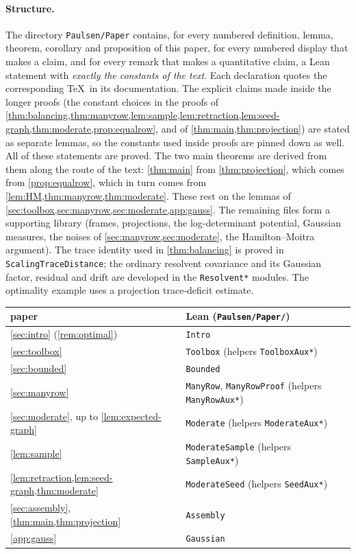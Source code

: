 \paragraph{Structure.} The directory \texttt{Paulsen/Paper} contains, for every numbered definition, lemma, theorem, corollary and
proposition of this paper, for every numbered display that makes a claim, and
for every remark that makes a quantitative claim, a Lean statement with
\emph{exactly the constants of the text}. Each declaration quotes the
corresponding \TeX\ in its documentation. The explicit claims made inside the
longer proofs (the constant choices in the proofs of
\cref{thm:balancing,thm:manyrow,lem:sample,lem:retraction,lem:seed-graph,thm:moderate,prop:equalrow},
and of \cref{thm:main,thm:projection}) are stated as separate lemmas, so the
constants used inside proofs are pinned down as well. All of these statements
are proved. The two main theorems are derived from them along the route of the
text:
\cref{thm:main} from \cref{thm:projection}, which comes from \cref{prop:equalrow}, which in turn comes from
\cref{lem:HM,thm:manyrow,thm:moderate}. These rest on the lemmas of
\cref{sec:toolbox,sec:manyrow,sec:moderate,app:gauss}. The remaining files form a supporting
library (frames, projections, the log-determinant potential, Gaussian measures,
the noises of \cref{sec:manyrow,sec:moderate}, the Hamilton--Moitra argument).
The trace identity used in \cref{thm:balancing} is proved in
\texttt{ScalingTraceDistance}; the ordinary resolvent covariance and its
Gaussian factor, residual and drift are developed in the \texttt{Resolvent*}
modules. The optimality example uses a projection trace-deficit estimate.
\begin{center}
\small
\begin{tabular}{@{}ll@{}}
\toprule
paper & Lean (\texttt{Paulsen/Paper/})\\
\midrule
\cref{sec:intro} (\cref{rem:optimal}) & \texttt{Intro}\\
\cref{sec:toolbox} & \texttt{Toolbox} (helpers \texttt{ToolboxAux*})\\
\cref{sec:bounded} & \texttt{Bounded}\\
\cref{sec:manyrow} & \texttt{ManyRow}, \texttt{ManyRowProof} (helpers \texttt{ManyRowAux*})\\
\cref{sec:moderate}, up to \cref{lem:expected-graph} & \texttt{Moderate} (helpers \texttt{ModerateAux*})\\
\cref{lem:sample} & \texttt{ModerateSample} (helpers \texttt{SampleAux*})\\
\cref{lem:retraction,lem:seed-graph,thm:moderate} & \texttt{ModerateSeed} (helpers \texttt{SeedAux*})\\
\cref{sec:assembly}, \cref{thm:main,thm:projection} & \texttt{Assembly}\\
\cref{app:gauss} & \texttt{Gaussian}\\
\bottomrule
\end{tabular}
\end{center}

